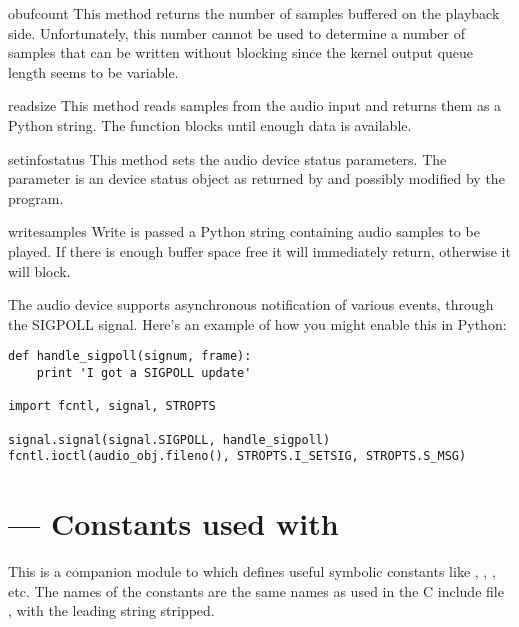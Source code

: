 \begin{methoddesc}{obufcount}{}
This method returns the number of samples buffered on the playback
side. Unfortunately, this number cannot be used to determine a number
of samples that can be written without blocking since the kernel
output queue length seems to be variable.
\end{methoddesc}

\begin{methoddesc}{read}{size}
This method reads  samples from the audio input and returns
them as a Python string. The function blocks until enough data is available.
\end{methoddesc}

\begin{methoddesc}{setinfo}{status}
This method sets the audio device status parameters. The 
parameter is an device status object as returned by  and
possibly modified by the program.
\end{methoddesc}

\begin{methoddesc}{write}{samples}
Write is passed a Python string containing audio samples to be played.
If there is enough buffer space free it will immediately return,
otherwise it will block.
\end{methoddesc}

The audio device supports asynchronous notification of various events,
through the SIGPOLL signal.  Here's an example of how you might enable
this in Python:

\begin{verbatim}
def handle_sigpoll(signum, frame):
    print 'I got a SIGPOLL update'

import fcntl, signal, STROPTS

signal.signal(signal.SIGPOLL, handle_sigpoll)
fcntl.ioctl(audio_obj.fileno(), STROPTS.I_SETSIG, STROPTS.S_MSG)
\end{verbatim}


\section{ ---
         Constants used with }



This is a companion module to
 which defines
useful symbolic constants like ,
, , etc. The names of the
constants are the same names as used in the C include file
, with the leading string 
stripped.
